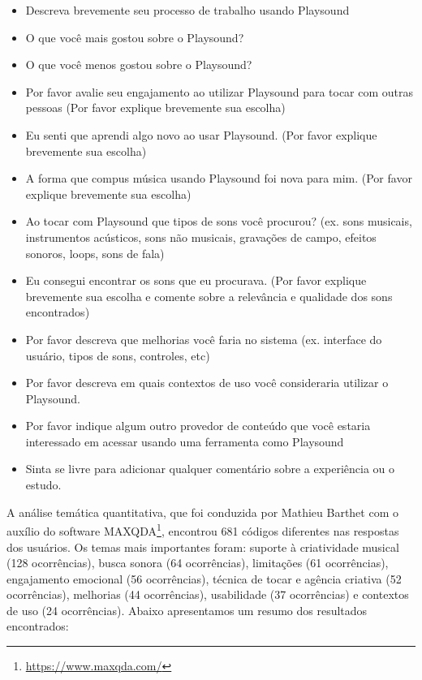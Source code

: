 \begin{itemize}

\item Descreva brevemente seu processo de trabalho usando Playsound

\item O que você mais gostou sobre o Playsound?

\item O que você menos gostou sobre o Playsound?

\item Por favor avalie seu engajamento ao utilizar Playsound para tocar com outras pessoas (Por favor explique brevemente sua escolha)

\item Eu senti que aprendi algo novo ao usar Playsound. (Por favor explique brevemente sua escolha)

\item A forma que compus música usando Playsound foi nova para mim. (Por favor explique brevemente sua escolha)

\item Ao tocar com Playsound que tipos de sons você procurou? (ex. sons musicais, instrumentos acústicos, sons não musicais, gravações de campo, efeitos sonoros, loops, sons de fala)

\item Eu consegui encontrar os sons que eu procurava. (Por favor explique brevemente sua escolha e comente sobre a relevância e qualidade dos sons encontrados)

\item Por favor descreva que melhorias você faria no sistema (ex. interface do usuário, tipos de sons, controles, etc)

\item Por favor descreva em quais contextos de uso você consideraria utilizar o Playsound.

\item Por favor indique algum outro provedor de conteúdo que você estaria interessado em acessar usando uma ferramenta como Playsound

\item Sinta se livre para adicionar qualquer comentário sobre a experiência ou o estudo.

\end{itemize}

A análise temática quantitativa, que foi conduzida por Mathieu Barthet com o auxílio do software MAXQDA\footnote{\url{https://www.maxqda.com/}}, encontrou 681 códigos diferentes nas respostas dos usuários. Os temas mais importantes foram: suporte à criatividade musical (128 ocorrências), busca sonora (64 ocorrências), limitações (61 ocorrências), engajamento emocional (56 ocorrências), técnica de tocar e agência criativa (52 ocorrências), melhorias (44 ocorrências), usabilidade (37 ocorrências) e contextos de uso (24 ocorrências). Abaixo apresentamos um resumo dos resultados encontrados:


